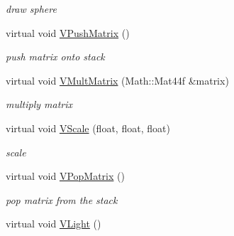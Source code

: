 \begin{DoxyCompactItemize}
\begin{DoxyCompactList}\small\item\em draw sphere \item\end{DoxyCompactList}\item 
\hypertarget{classPlatform_1_1Renderer_1_1Renderer_ab5223c4e635e9f9cf32b14bdc6713285}{
virtual void \hyperlink{classPlatform_1_1Renderer_1_1Renderer_ab5223c4e635e9f9cf32b14bdc6713285}{VPushMatrix} ()}
\label{classPlatform_1_1Renderer_1_1Renderer_ab5223c4e635e9f9cf32b14bdc6713285}

\begin{DoxyCompactList}\small\item\em push matrix onto stack \item\end{DoxyCompactList}\item 
\hypertarget{classPlatform_1_1Renderer_1_1Renderer_ae294bb7697e09f4db321eb5d35c8121c}{
virtual void \hyperlink{classPlatform_1_1Renderer_1_1Renderer_ae294bb7697e09f4db321eb5d35c8121c}{VMultMatrix} (Math::Mat44f \&matrix)}
\label{classPlatform_1_1Renderer_1_1Renderer_ae294bb7697e09f4db321eb5d35c8121c}

\begin{DoxyCompactList}\small\item\em multiply matrix \item\end{DoxyCompactList}\item 
\hypertarget{classPlatform_1_1Renderer_1_1Renderer_ac170b69c81ea56afc9b06044c2de0b88}{
virtual void \hyperlink{classPlatform_1_1Renderer_1_1Renderer_ac170b69c81ea56afc9b06044c2de0b88}{VScale} (float, float, float)}
\label{classPlatform_1_1Renderer_1_1Renderer_ac170b69c81ea56afc9b06044c2de0b88}

\begin{DoxyCompactList}\small\item\em scale \item\end{DoxyCompactList}\item 
\hypertarget{classPlatform_1_1Renderer_1_1Renderer_aed686ed34cf282b391e59ad75011cfc8}{
virtual void \hyperlink{classPlatform_1_1Renderer_1_1Renderer_aed686ed34cf282b391e59ad75011cfc8}{VPopMatrix} ()}
\label{classPlatform_1_1Renderer_1_1Renderer_aed686ed34cf282b391e59ad75011cfc8}

\begin{DoxyCompactList}\small\item\em pop matrix from the stack \item\end{DoxyCompactList}\item 
\hypertarget{classPlatform_1_1Renderer_1_1Renderer_a7462bf727d5a63cc8542a5e8e7c0447e}{
virtual void \hyperlink{classPlatform_1_1Renderer_1_1Renderer_a7462bf727d5a63cc8542a5e8e7c0447e}{VLight} ()}
\label{classPlatform_1_1Renderer_1_1Renderer_a7462bf727d5a63cc8542a5e8e7c0447e}


\end{DoxyCompactItemize}

